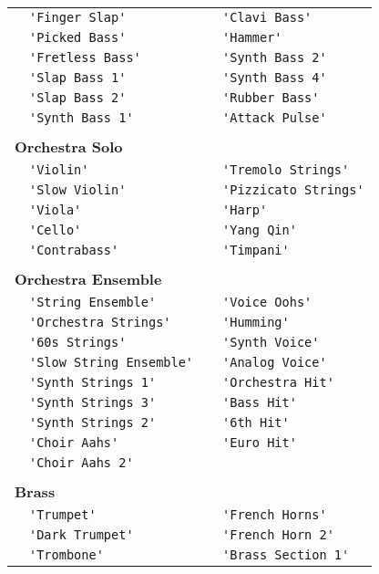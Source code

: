\documentclass{article}
\newcommand{\instrusection}[1]{ \\[5pt] \multicolumn{4}{l}{\textbf{#1}}\\}
\newcommand\lvlo{}
\newcommand\lvlt{\ding{105}}
\begin{document}
\begin{center}
\begin{longtable}{ll|ll}
 \lvlt & \lstinline!'Finger Slap'! & \lvlt & \lstinline!'Clavi Bass'! \\
 \lvlo & \lstinline!'Picked Bass'! & \lvlt & \lstinline!'Hammer'! \\
 \lvlo & \lstinline!'Fretless Bass'! & \lvlo & \lstinline!'Synth Bass 2'! \\
 \lvlo & \lstinline!'Slap Bass 1'! & \lvlt & \lstinline!'Synth Bass 4'! \\
 \lvlo & \lstinline!'Slap Bass 2'! & \lvlt & \lstinline!'Rubber Bass'! \\
 \lvlo & \lstinline!'Synth Bass 1'! & \lvlt & \lstinline!'Attack Pulse'! \\
\instrusection{Orchestra Solo}
 \lvlo & \lstinline!'Violin'! & \lvlo & \lstinline!'Tremolo Strings'! \\
 \lvlt & \lstinline!'Slow Violin'! & \lvlo & \lstinline!'Pizzicato Strings'! \\
 \lvlo & \lstinline!'Viola'! & \lvlo & \lstinline!'Harp'! \\
 \lvlo & \lstinline!'Cello'! & \lvlt & \lstinline!'Yang Qin'! \\
 \lvlo & \lstinline!'Contrabass'! & \lvlo & \lstinline!'Timpani'! \\
\instrusection{Orchestra Ensemble}
 \lvlo & \lstinline!'String Ensemble'! & \lvlo & \lstinline!'Voice Oohs'! \\
 \lvlt & \lstinline!'Orchestra Strings'! & \lvlt & \lstinline!'Humming'! \\
 \lvlt & \lstinline!'60s Strings'! & \lvlo & \lstinline!'Synth Voice'! \\
 \lvlo & \lstinline!'Slow String Ensemble'! & \lvlt & \lstinline!'Analog Voice'! \\
 \lvlo & \lstinline!'Synth Strings 1'! & \lvlo & \lstinline!'Orchestra Hit'! \\
 \lvlt & \lstinline!'Synth Strings 3'! & \lvlt & \lstinline!'Bass Hit'! \\
 \lvlo & \lstinline!'Synth Strings 2'! & \lvlt & \lstinline!'6th Hit'! \\
 \lvlo & \lstinline!'Choir Aahs'! & \lvlt & \lstinline!'Euro Hit'! \\
 \lvlt & \lstinline!'Choir Aahs 2'! \\
\instrusection{Brass}
 \lvlo & \lstinline!'Trumpet'! & \lvlo & \lstinline!'French Horns'! \\
 \lvlt & \lstinline!'Dark Trumpet'! & \lvlt & \lstinline!'French Horn 2'! \\
 \lvlo & \lstinline!'Trombone'! & \lvlo & \lstinline!'Brass Section 1'! \\

\end{longtable}
\end{center}
\end{document}
